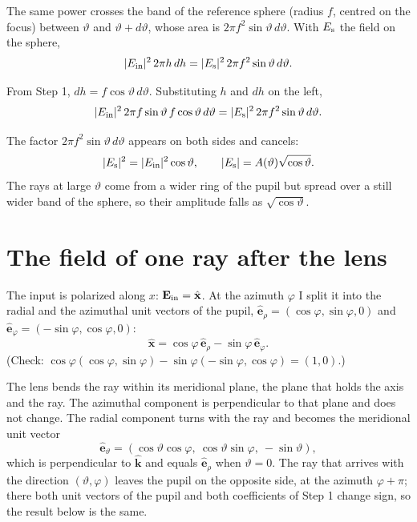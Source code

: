 \documentclass[11pt]{article}
\begin{document}
 The same power crosses the band of the reference sphere (radius $f$, centred on the focus) between
$\vartheta$ and $\vartheta + d\vartheta$, whose area is $2\pi f^2\sin\vartheta\,d\vartheta$. With $E_{\rm s}$ the
field on the sphere,
\begin{equation}|E_{\rm in}|^2\,2\pi h\,dh = |E_{\rm s}|^2\,2\pi f^2\sin\vartheta\,d\vartheta .\end{equation}

 From Step 1, $dh = f\cos\vartheta\,d\vartheta$. Substituting $h$ and $dh$ on the left,
\begin{equation}|E_{\rm in}|^2\,2\pi f\sin\vartheta\,f\cos\vartheta\,d\vartheta
= |E_{\rm s}|^2\,2\pi f^2\sin\vartheta\,d\vartheta .\end{equation}

 The factor $2\pi f^2\sin\vartheta\,d\vartheta$ appears on both sides and cancels:
\begin{equation}|E_{\rm s}|^2 = |E_{\rm in}|^2\cos\vartheta,\qquad |E_{\rm s}| = A(\vartheta)\sqrt{\cos\vartheta} .\end{equation}
The rays at large $\vartheta$ come from a wider ring of the pupil but spread over a still wider band of the sphere,
so their amplitude falls as $\sqrt{\cos\vartheta}$.

\section{The field of one ray after the lens}
 The input is polarized along $x$: $\mathbf E_{\rm in} = \hat{\mathbf x}$. At the azimuth $\varphi$ I split
it into the radial and the azimuthal unit vectors of the pupil,
$\hat{\mathbf e}_\rho = (\cos\varphi, \sin\varphi, 0)$ and $\hat{\mathbf e}_\varphi = (-\sin\varphi, \cos\varphi, 0)$:
\begin{equation}\hat{\mathbf x} = \cos\varphi\,\hat{\mathbf e}_\rho - \sin\varphi\,\hat{\mathbf e}_\varphi .\end{equation}
(Check: $\cos\varphi(\cos\varphi, \sin\varphi) - \sin\varphi(-\sin\varphi, \cos\varphi) = (1, 0)$.)

 The lens bends the ray within its meridional plane, the plane that holds the axis and the ray. The azimuthal
component is perpendicular to that plane and does not change. The radial component turns with the ray and becomes the
meridional unit vector
\begin{equation}\hat{\mathbf e}_\vartheta = (\cos\vartheta\cos\varphi,\ \cos\vartheta\sin\varphi,\ -\sin\vartheta) ,\end{equation}
which is perpendicular to $\hat{\mathbf k}$ and equals $\hat{\mathbf e}_\rho$ when $\vartheta = 0$. The ray that arrives
with the direction $(\vartheta, \varphi)$ leaves the pupil on the opposite side, at the azimuth $\varphi + \pi$; there
both unit vectors of the pupil and both coefficients of Step 1 change sign, so the result below is the same.
\end{document}
